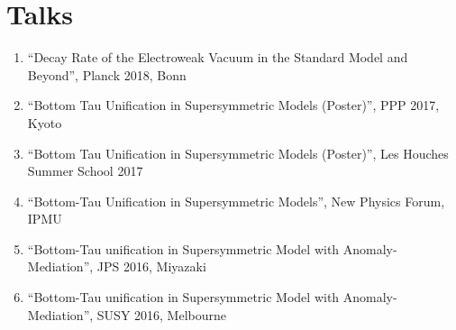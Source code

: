 \documentclass[12pt]{article}
\begin{document}
\vspace{-5mm}


\nocite{*}

\section*{Talks}

\begin{enumerate}
 \item ``Decay Rate of the Electroweak Vacuum in the Standard Model and Beyond'', Planck 2018, Bonn
 \item ``Bottom Tau Unification in Supersymmetric Models (Poster)'', PPP 2017, Kyoto
 \item ``Bottom Tau Unification in Supersymmetric Models (Poster)'', Les Houches Summer School 2017
 \item ``Bottom-Tau Unification in Supersymmetric Models'', New Physics Forum, IPMU
 \item ``Bottom-Tau unification in Supersymmetric Model with Anomaly-Mediation'', JPS 2016, Miyazaki
 \item ``Bottom-Tau unification in Supersymmetric Model with Anomaly-Mediation'', SUSY 2016, Melbourne
\end{enumerate}
\end{document}

